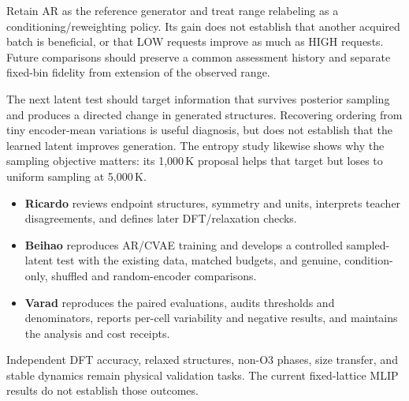 Retain AR as the reference generator and treat range relabeling as a
conditioning/reweighting policy. Its gain does not establish that another
acquired batch is beneficial, or that LOW requests improve as much as HIGH
requests. Future comparisons should preserve a common assessment history
and separate fixed-bin fidelity from extension of the observed range.

The next latent test should target information that survives posterior
sampling and produces a directed change in generated structures. Recovering
ordering from tiny encoder-mean variations is useful diagnosis, but does not
establish that the learned latent improves generation. The entropy study
likewise shows why the sampling objective matters: its 1,000\,K proposal
helps that target but loses to uniform sampling at 5,000\,K.

\begin{itemize}[leftmargin=*,itemsep=3pt]
\item \textbf{Ricardo} reviews endpoint structures, symmetry and units,
interprets teacher disagreements, and defines later DFT/relaxation checks.
\item \textbf{Beihao} reproduces AR/CVAE training and develops a controlled
sampled-latent test with the existing data, matched budgets, and genuine,
condition-only, shuffled and random-encoder comparisons.
\item \textbf{Varad} reproduces the paired evaluations, audits thresholds
and denominators, reports per-cell variability and negative results, and
maintains the analysis and cost receipts.
\end{itemize}

Independent DFT accuracy, relaxed structures, non-O3 phases, size transfer,
and stable dynamics remain physical validation tasks. The current
fixed-lattice MLIP results do not establish those outcomes.

